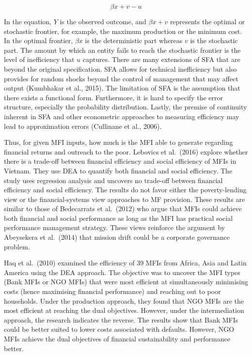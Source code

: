 \documentclass[a4paper, nobind]{templates/ociamthesis}
\begin{document}
\begin{equation}
\beta{x} + v - u
\end{equation}

In the equation, \(Y\) is the observed outcome, and \(\beta{x} + v\) represents the optimal or stochastic frontier, for example, the maximum production or the minimum cost. In the optimal frontier, \(\beta{x}\) is the deterministic part whereas \(v\) is the stochastic part. The amount by which an entity fails to reach the stochastic frontier is the level of inefficiency that \(u\) captures. There are many extensions of SFA that are beyond the original specification. SFA allows for technical inefficiency but also provides for random shocks beyond the control of management that may affect output (Kumbhakar et al., 2015). The limitation of SFA is the assumption that there exists a functional form. Furthermore, it is hard to specify the error structure, especially the probability distribution. Lastly, the premise of continuity inherent in SFA and other econometric approaches to measuring efficiency may lead to approximation errors (Cullinane et al., 2006).

Thus, for given MFI inputs, how much is the MFI able to generate regarding financial returns and outreach to the poor. Lebovics et al.~(2016) explore whether there is a trade-off between financial efficiency and social efficiency of MFIs in Vietnam. They use DEA to quantify both financial and social efficiency. The study uses regression analysis and uncovers no trade-off between financial efficiency and social efficiency. The results do not favor either the poverty-lending view or the financial-systems view approaches to MF provision. These results are similar to those of Bedecarrats et al.~(2012) who argue that MFIs could achieve both financial and social performance as long as the MFI has practical social performance management strategy. These views reinforce the argument by Abeysekera et al.~(2014) that mission drift could be a corporate governance problem.

Haq et al.~(2010) examined the efficiency of 39 MFIs from Africa, Asia and Latin America using the DEA approach. The objective was to uncover the MFI types (Bank MFIs or NGO MFIs) that were most efficient at simultaneously minimising costs (hence maximising financial performance) and reaching out to poor households. Under the production approach, they found that NGO MFIs are the most efficient at reaching the dual objectives. However, under the intermediation approach, the research indicates the reverse. The results show that Bank MFIs could be better suited to lower costs associated with defaults. However, NGO MFIs achieve the dual objectives of financial sustainability and performance better.
\end{document}
